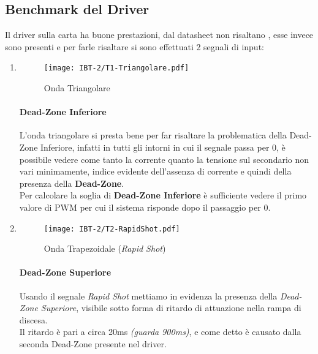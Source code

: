 \subsection{Benchmark del Driver}
Il driver sulla carta ha buone prestazioni, dal datasheet non risaltano \nonLinearita, esse invece sono presenti e per farle risaltare si sono effettuati 2 segnali di input:
\begin{enumerate}
	\item {} \vspace{-3mm}
	      \begin{figure}[H]
		      \caption[Esperimento con Onda Triangolare]{Onda Triangolare}
		      \centering
		      \texttt{[image: IBT-2/T1-Triangolare.pdf]}
	      \end{figure}\vspace{-10mm}
	      \paragraph{Dead-Zone Inferiore} L'onda triangolare si presta bene per far risaltare la problematica della Dead-Zone Inferiore, infatti in tutti gli intorni in cui il segnale passa per 0, è possibile vedere come tanto la corrente quanto la tensione sul secondario non vari minimamente, indice evidente dell'assenza di corrente e quindi della presenza della \textbf{Dead-Zone}.\\
	      Per calcolare la soglia di \textbf{Dead-Zone Inferiore} è sufficiente vedere il primo valore di PWM  per cui il sistema risponde dopo il passaggio per 0.      
	      \newpage
	\item {}  \vspace{-3mm}
	      \begin{figure}[H]
		      \centering
		      \caption[Esperimento con Onda Trapezoidale (\textit{Rapid Shot})]{Onda Trapezoidale (\textit{Rapid Shot})}
		      \texttt{[image: IBT-2/T2-RapidShot.pdf]}
	      \end{figure}  \vspace{-15mm}
	      \paragraph{Dead-Zone Superiore} Usando il segnale \textit{Rapid Shot} mettiamo in evidenza la presenza della \textit{Dead-Zone Superiore}, visibile sotto forma di ritardo di attuazione nella rampa di discesa.\\
	      Il ritardo è pari a circa 20ms {\small \textit{(guarda 900ms)}}, e come detto è causato dalla seconda Dead-Zone presente nel driver.
\end{enumerate}
